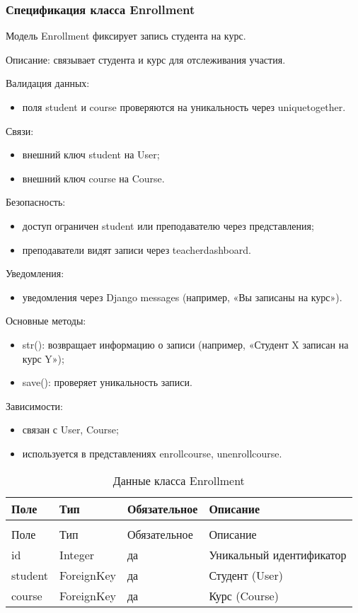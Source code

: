 \subsubsection{Спецификация класса Enrollment}

Модель Enrollment фиксирует запись студента на курс.


Описание: связывает студента и курс для отслеживания участия.

Валидация данных:
	\begin{itemize}
		\item поля student и course проверяются на уникальность через uniquetogether.
	\end{itemize}
	
Связи:
	\begin{itemize}
		\item внешний ключ student на User;
		\item внешний ключ course на Course.
	\end{itemize}
	
Безопасность:
	\begin{itemize}
		\item доступ ограничен student или преподавателю через представления;
		\item преподаватели видят записи через teacherdashboard.
	\end{itemize}
	
Уведомления:
	\begin{itemize}
		\item уведомления через Django messages (например, «Вы записаны на курс»).
	\end{itemize}
	
Основные методы:
	\begin{itemize}
		\item str(): возвращает информацию о записи (например, «Студент X записан на курс Y»);
		\item save(): проверяет уникальность записи.
	\end{itemize}
	
Зависимости:
	\begin{itemize}
		\item связан с User, Course;
		\item используется в представлениях enrollcourse, unenrollcourse.
	\end{itemize}


\begin{xltabular}{\textwidth}{|l|l|l|X|}
	\caption{Данные класса Enrollment\label{tab:enrollment_attributes}}\\
	\hline
	Поле & Тип & Обязательное & Описание \\ \hline
	\endfirsthead
	\\
	\hline
	Поле & Тип & Обязательное & Описание \\ \hline
	\endhead
	id & Integer & да & Уникальный идентификатор \\ \hline
	student & ForeignKey & да & Студент (User) \\ \hline
	course & ForeignKey & да & Курс (Course) \\ \hline
\end{xltabular}

